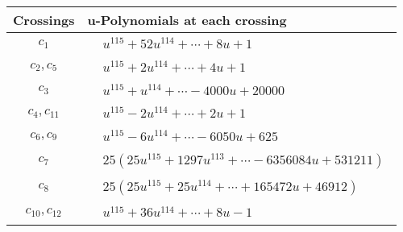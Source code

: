 \documentclass[1p]{elsarticle_modified}
\theoremstyle{definition}
\begin{document}
\begin{tabular}{m{50pt}|m{274pt}}
Crossings & \hspace{64pt}u-Polynomials at each crossing \\
\hline $$\begin{aligned}c_{1}\end{aligned}$$&$\begin{aligned}
&u^{115}+52 u^{114}+\cdots+8 u+1
\end{aligned}$\\
\hline $$\begin{aligned}c_{2},c_{5}\end{aligned}$$&$\begin{aligned}
&u^{115}+2 u^{114}+\cdots+4 u+1
\end{aligned}$\\
\hline $$\begin{aligned}c_{3}\end{aligned}$$&$\begin{aligned}
&u^{115}+u^{114}+\cdots-4000 u+20000
\end{aligned}$\\
\hline $$\begin{aligned}c_{4},c_{11}\end{aligned}$$&$\begin{aligned}
&u^{115}-2 u^{114}+\cdots+2 u+1
\end{aligned}$\\
\hline $$\begin{aligned}c_{6},c_{9}\end{aligned}$$&$\begin{aligned}
&u^{115}-6 u^{114}+\cdots-6050 u+625
\end{aligned}$\\
\hline $$\begin{aligned}c_{7}\end{aligned}$$&$\begin{aligned}
&25(25 u^{115}+1297 u^{113}+\cdots-6356084 u+531211)
\end{aligned}$\\
\hline $$\begin{aligned}c_{8}\end{aligned}$$&$\begin{aligned}
&25(25 u^{115}+25 u^{114}+\cdots+165472 u+46912)
\end{aligned}$\\
\hline $$\begin{aligned}c_{10},c_{12}\end{aligned}$$&$\begin{aligned}
&u^{115}+36 u^{114}+\cdots+8 u-1
\end{aligned}$\\
\hline
\end{tabular}\\~\\
\end{document}
